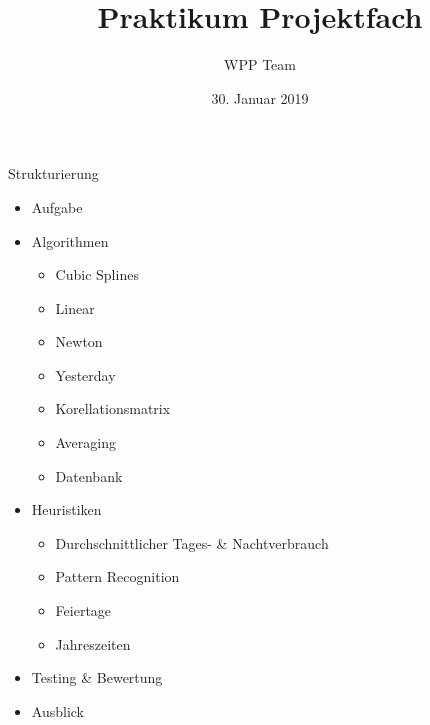 \documentclass{beamer}           %
\title[WPP]{Praktikum Projektfach}
\author[Team]{WPP Team}
\institute{Hochschule Niederrhein - Fachbereich Elektrotechnik \& Informatik}
\date{30. Januar 2019}
\begin{document}
\frame[plain]{\titlepage}



\begin{frame}{Strukturierung}
	\begin{itemize}
		\item Aufgabe %
		\item Algorithmen %
		\begin{itemize}
			\item Cubic Splines %
			\item Linear %
			\item Newton %
			\item Yesterday %
			\item Korellationsmatrix %
			\item Averaging %
			\item Datenbank %
		\end{itemize}
		\item Heuristiken %
		\begin{itemize}
			\item Durchschnittlicher Tages- \& Nachtverbrauch %
			\item Pattern Recognition %
			\item Feiertage %
			\item Jahreszeiten %
		\end{itemize}
		\item Testing \& Bewertung %
		\item Ausblick %
	\end{itemize}
\end{frame}



\begin{frame}{}
\fontsize{24pt}{12pt}\selectfont
{}
\end{frame}
\end{document}

